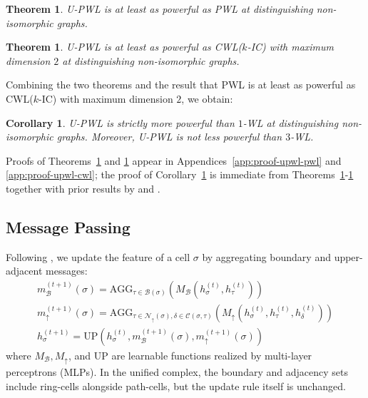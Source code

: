 \documentclass[letterpaper]{article} %
\newtheorem{corollary}[definition]{Corollary}
\newtheorem{theorem}[definition]{Theorem}
\begin{document}
\begin{theorem} \label{thm:upwl-ge-pwl}
    U-PWL is at least as powerful as PWL at distinguishing non-isomorphic graphs.
\end{theorem}
\begin{theorem} \label{thm:upwl-ge-cwl}
    U-PWL is at least as powerful as CWL(\(k\)-IC) with maximum dimension \(2\) at distinguishing non-isomorphic graphs.
\end{theorem}
Combining the two theorems and the result \cite{truong_weisfeiler_2024} that PWL is at least as powerful as CWL(\(k\)-IC) with maximum dimension \(2\), we obtain:
\begin{corollary} \label{cor:upwl-strict}
    U-PWL is strictly more powerful than \(1\)-WL at distinguishing non-isomorphic graphs. Moreover, U-PWL is not less powerful than \(3\)-WL.
\end{corollary}
Proofs of Theorems~\ref{thm:upwl-ge-pwl} and \ref{thm:upwl-ge-cwl} appear in Appendices~\ref{app:proof-upwl-pwl} and \ref{app:proof-upwl-cwl}; the proof of Corollary~\ref{cor:upwl-strict} is immediate from Theorems~\ref{thm:upwl-ge-pwl}-\ref{thm:upwl-ge-cwl} together with prior results by \citeauthor{bodnar_weisfeiler_2021} and \citeauthor{truong_weisfeiler_2024}.

\subsection{Message Passing} \label{subsec:mp}
Following \cite{bodnar_weisfeiler_2022, truong_weisfeiler_2024}, we update the feature of a cell \(\sigma\) by aggregating boundary and upper-adjacent messages:
\begin{gather*}
    m_\mathcal{B}^{(t+1)}(\sigma) = \text{AGG}_{\tau \in \mathcal{B}(\sigma)} \left( M_\mathcal{B}(h_\sigma^{(t)}, h_\tau^{(t)}) \right) \\
    m_\uparrow^{(t+1)}(\sigma) = \text{AGG}_{\tau \in \mathcal{N}_\uparrow(\sigma), \delta \in \mathcal{C}(\sigma, \tau)} \left( M_\uparrow(h_\sigma^{(t)}, h_\tau^{(t)}, h_\delta^{(t)}) \right) \\
    h_\sigma^{(t+1)} = \text{UP}\left( h_\sigma^{(t)}, m_\mathcal{B}^{(t+1)}(\sigma), m_\uparrow^{(t+1)}(\sigma) \right)
\end{gather*}
where \(M_\mathcal{B}, M_\uparrow\), and UP are learnable functions realized by multi-layer perceptrons (MLPs). In the unified complex, the boundary and adjacency sets include ring-cells alongside path-cells, but the update rule itself is unchanged.
\end{document}
